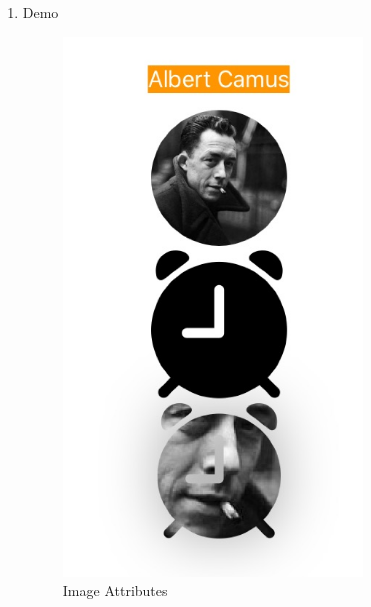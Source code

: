 \documentclass[a4paper,12pt]{article}
\begin{document}
\begin{enumerate}
\item Demo
\label{sec:orgd2e4cf1}
\begin{figure}[htbp]
\centering
\includegraphics[width=300]{images/image-advanced-attributes.jpg}
\caption{\label{fig:Adv-Image-Attributes}Image Attributes}
\end{figure}
\end{enumerate}
\end{document}
